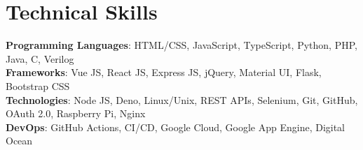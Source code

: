 \section{Technical Skills}
 \begin{itemize}[leftmargin=0.15in, label={}]
    \small{\item{
     \textbf{Programming Languages}{: HTML/CSS, JavaScript, TypeScript, Python, PHP, Java, C, Verilog} \\
     \textbf{Frameworks}{: Vue JS, React JS, Express JS, jQuery, Material UI, Flask, Bootstrap CSS } \\
     \textbf{Technologies}{: Node JS, Deno, Linux/Unix, REST APIs, Selenium, Git, GitHub, OAuth 2.0, Raspberry Pi, Nginx } \\
     \textbf{DevOps}{: GitHub Actions, CI/CD, Google Cloud, Google App Engine, Digital Ocean }
    }}
 \end{itemize}
